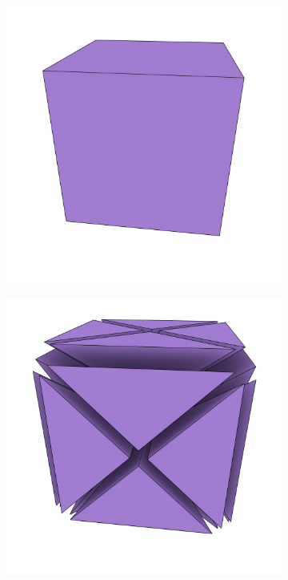 \begin{figure}
\centering
\begin{subfigure}{0.33\linewidth}
\includegraphics[width=\linewidth]{figs/cube}
\caption{}%
\label{subfig:cube}
\end{subfigure}%
\begin{subfigure}{0.33\linewidth}
\includegraphics[width=\linewidth]{figs/cmap-3d}

\end{subfigure}
\end{figure}
